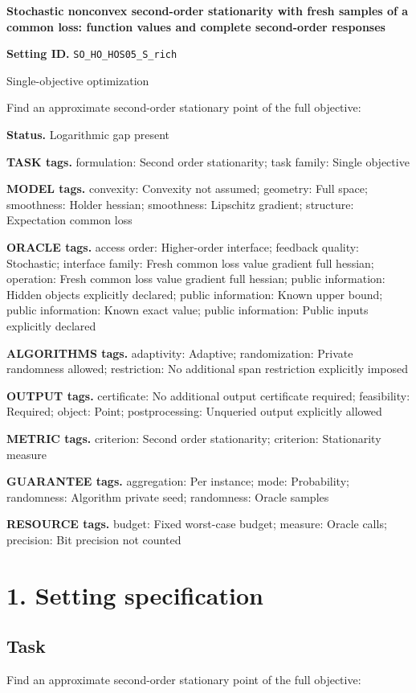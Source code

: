 \documentclass[10pt,a4paper]{article}
\begin{document}
\raggedright

{\LARGE\bfseries\sffamily\color{AtlasNavy} Stochastic nonconvex second-order stationarity with fresh samples of a common loss: function values and complete second-order responses\par}\vspace{5pt}
\textbf{Setting ID.} \texttt{SO\_\allowbreak{}HO\_\allowbreak{}HOS05\_\allowbreak{}S\_\allowbreak{}rich}

Single-objective optimization

Find an approximate second-order stationary point of the full objective:

\textbf{Status.} Logarithmic gap present

\textbf{TASK tags.} formulation: Second order stationarity; task family: Single objective

\textbf{MODEL tags.} convexity: Convexity not assumed; geometry: Full space; smoothness: Holder hessian; smoothness: Lipschitz gradient; structure: Expectation common loss

\textbf{ORACLE tags.} access order: Higher-order interface; feedback quality: Stochastic; interface family: Fresh common loss value gradient full hessian; operation: Fresh common loss value gradient full hessian; public information: Hidden objects explicitly declared; public information: Known upper bound; public information: Known exact value; public information: Public inputs explicitly declared

\textbf{ALGORITHMS tags.} adaptivity: Adaptive; randomization: Private randomness allowed; restriction: No additional span restriction explicitly imposed

\textbf{OUTPUT tags.} certificate: No additional output certificate required; feasibility: Required; object: Point; postprocessing: Unqueried output explicitly allowed

\textbf{METRIC tags.} criterion: Second order stationarity; criterion: Stationarity measure

\textbf{GUARANTEE tags.} aggregation: Per instance; mode: Probability; randomness: Algorithm private seed; randomness: Oracle samples

\textbf{RESOURCE tags.} budget: Fixed worst-case budget; measure: Oracle calls; precision: Bit precision not counted

\section{1. Setting specification}
\subsection{Task}
Find an approximate second-order stationary point of the full objective:
\end{document}
